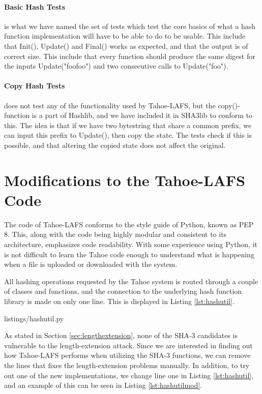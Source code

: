 \documentclass[english,12pt,a4paper]{book}
\begin{document}
\paragraph{Basic Hash Tests} is what we have named the set of tests which test
the core basics of what a hash function implementation will have to be able to
do to be usable. This include that Init(), Update() and Final() works as
expected, and that the output is of correct size. This include that every
function should produce the same digest for the inputs Update("foofoo") and two
consecutive calls to Update("foo").

\paragraph{Copy Hash Tests} does not test any of the functionality used by
Tahoe-\ac{LAFS}, but the copy()-function is a part of Hashlib, and we have
included it in SHA3lib to conform to this. The idea is that if we have two
bytestring that share a common prefix, we can input this prefix to Update(),
then copy the state. The tests check if this is possible, and that altering the
copied state does not affect the original.


\section{Modifications to the Tahoe-LAFS Code}
\label{sec:modtahoe}

The code of Tahoe-LAFS conforms to the style guide of Python, known as PEP 8.
This, along with the code being highly modular and consistent to its
architecture, emphasizes code readability.
With some experience using Python, it is not difficult to learn the Tahoe code
enough to understand what is happening when a file is uploaded or downloaded
with the system.

All hashing operations requested by the Tahoe system is routed through a
couple of classes and functions, and the connection to the underlying hash
function library is made on only one line. This is displayed in Listing
\ref{lst:hashutil}.


{listings/hashutil.py}

As stated in Section \ref{sec:lengthextension}, none of the SHA-3 candidates is
vulnerable to the length-extension attack. Since we are interested in finding
out how Tahoe-\ac{LAFS} performs when utilizing the SHA-3 functions, we can
remove the lines that fixes the length-extension problems manually. In addition,
to try out one of the new implementations, we change line one in Listing
\ref{lst:hashutil}, and an example of this can be seen in Listing
\ref{lst:hashutilmod}.
\end{document}
